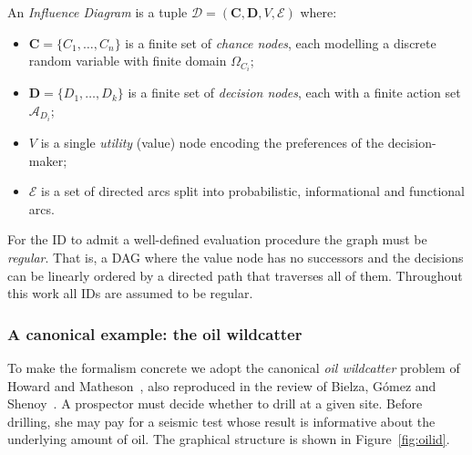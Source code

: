 \begin{definition}
\label{def:id}
An \emph{Influence Diagram} is a tuple
$\mathcal{D} = (\mathbf{C}, \mathbf{D}, V, \mathcal{E})$ where:
\begin{itemize}
    \item $\mathbf{C} = \{C_1,\ldots,C_n\}$ is a finite set of
          \emph{chance nodes}, each modelling a discrete random
          variable with finite domain $\Omega_{C_i}$;
    \item $\mathbf{D} = \{D_1,\ldots,D_k\}$ is a finite set of
          \emph{decision nodes}, each with a finite action set
          $\mathcal{A}_{D_i}$;
    \item $V$ is a single \emph{utility} (value) node encoding the
          preferences of the decision-maker;
    \item $\mathcal{E}$ is a set of directed arcs split into
          probabilistic, informational and functional arcs.
\end{itemize}
\end{definition}

For the ID to admit a well-defined evaluation procedure the graph
must be \emph{regular}. That is, a DAG where the value node has no successors and the decisions can be linearly ordered by a directed path that traverses all of them. Throughout this work all IDs are
assumed to be regular.

\subsubsection*{A canonical example: the oil wildcatter}
\label{sec:oil-wildcatter}

To make the formalism concrete we adopt the canonical \emph{oil
wildcatter} problem of Howard and Matheson~\cite{howard2005influence},
also reproduced in the review of Bielza, G{\'o}mez and
Shenoy~\cite{bielza2011review}. A prospector must decide whether to
drill at a given site. Before drilling, she may pay for a seismic
test whose result is informative about the underlying amount of oil.
The graphical structure is shown in Figure~\ref{fig:oilid}.


